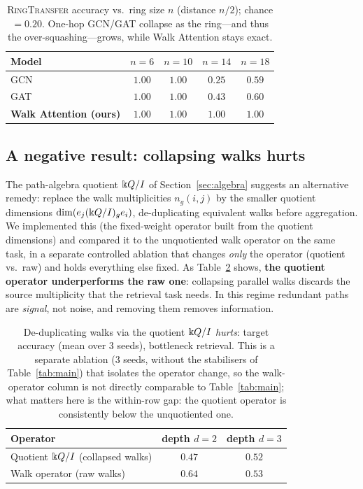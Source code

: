 \begin{table}[t]
\centering
\caption{\textsc{RingTransfer} accuracy vs.\ ring size $n$ (distance $n/2$);
chance $=0.20$. One-hop GCN/GAT collapse as the ring---and thus the
over-squashing---grows, while Walk Attention stays exact.}
\label{tab:ring}
\begin{tabular}{lcccc}
\toprule
\textbf{Model} & $n{=}6$ & $n{=}10$ & $n{=}14$ & $n{=}18$ \\
\midrule
GCN                    & $1.00$ & $1.00$ & $0.25$ & $0.59$ \\
GAT                    & $1.00$ & $1.00$ & $0.43$ & $0.60$ \\
\textbf{Walk Attention (ours)} & $\mathbf{1.00}$ & $\mathbf{1.00}$ & $\mathbf{1.00}$ & $\mathbf{1.00}$ \\
\bottomrule
\end{tabular}
\end{table}

\subsection{A negative result: collapsing walks hurts}

The path-algebra quotient $\Bbbk Q/I$ of Section~\ref{sec:algebra} suggests an
alternative remedy: replace the walk multiplicities $n_g(i,j)$ by the smaller
quotient dimensions $\dim(e_j(\Bbbk Q/I)_g e_i)$, de-duplicating equivalent walks
before aggregation. We implemented this (the fixed-weight operator built from the
quotient dimensions) and compared it to the unquotiented walk operator on the
same task, in a separate controlled ablation that changes \emph{only} the
operator (quotient vs.\ raw) and holds everything else fixed. As
Table~\ref{tab:quotient} shows, \textbf{the quotient operator underperforms the
raw one}: collapsing parallel walks discards the source multiplicity that the
retrieval task needs. In this regime redundant paths are \emph{signal}, not
noise, and removing them removes information.

\begin{table}[t]
\centering
\caption{De-duplicating walks via the quotient $\Bbbk Q/I$ \emph{hurts}: target
accuracy (mean over 3 seeds), bottleneck retrieval. This is a separate ablation
(3 seeds, without the stabilisers of Table~\ref{tab:main}) that isolates the
operator change, so the walk-operator column is not directly comparable to
Table~\ref{tab:main}; what matters here is the within-row gap: the quotient
operator is consistently below the unquotiented one.}
\label{tab:quotient}
\begin{tabular}{lcc}
\toprule
\textbf{Operator} & \textbf{depth $d=2$} & \textbf{depth $d=3$} \\
\midrule
Quotient $\Bbbk Q/I$ (collapsed walks) & $0.47$ & $0.52$ \\
Walk operator (raw walks)          & $\mathbf{0.64}$ & $\mathbf{0.53}$ \\
\bottomrule
\end{tabular}
\end{table}


